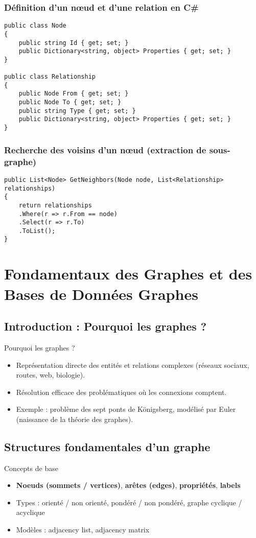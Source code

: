 \documentclass{beamer}
\begin{document}
\begin{frame}[fragile]
  \frametitle{Définition d’un nœud et d’une relation en C\#}

\begin{lstlisting}
public class Node
{
    public string Id { get; set; }
    public Dictionary<string, object> Properties { get; set; }
}

public class Relationship
{
    public Node From { get; set; }
    public Node To { get; set; }
    public string Type { get; set; }
    public Dictionary<string, object> Properties { get; set; }
}
\end{lstlisting}
\end{frame}

\begin{frame}[fragile]
  \frametitle{Recherche des voisins d’un nœud (extraction de sous-graphe)}
\begin{lstlisting}
public List<Node> GetNeighbors(Node node, List<Relationship> relationships)
{
    return relationships
    .Where(r => r.From == node)
    .Select(r => r.To)
    .ToList();
}
\end{lstlisting}
\end{frame}



\section{Fondamentaux des Graphes et des Bases de Données Graphes}
\subsection{Introduction : Pourquoi les graphes ?}
\begin{frame}{Pourquoi les graphes ?}
  \begin{itemize}
    \item Représentation directe des entités et relations complexes (réseaux sociaux, routes, web, biologie).
    \item Résolution efficace des problématiques où les connexions comptent.
    \item Exemple : problème des sept ponts de Königsberg, modélisé par Euler (naissance de la théorie des graphes).
  \end{itemize}
\end{frame}

\subsection{Structures fondamentales d'un graphe}
\begin{frame}{Concepts de base}
  \begin{itemize}
    \item \textbf{Noeuds (sommets / vertices)}, \textbf{arêtes (edges)}, \textbf{propriétés}, \textbf{labels}
    \item Types : orienté / non orienté, pondéré / non pondéré, graphe cyclique / acyclique
    \item Modèles : adjacency list, adjacency matrix
  \end{itemize}
\end{frame}
\end{document}
